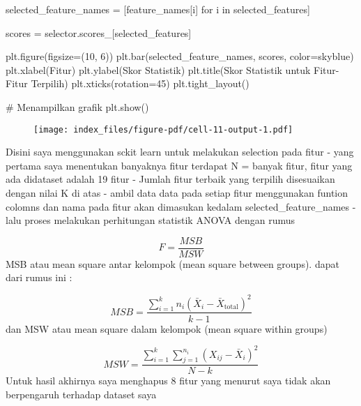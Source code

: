 \documentclass[
  letterpaper,
]{krantz}
\makeatletter
\newenvironment{Shaded}{\begin{snugshade}}{\end{snugshade}}
\newcommand{\CommentTok}[1]{\textcolor[rgb]{0.37,0.37,0.37}{#1}}
\newcommand{\ControlFlowTok}[1]{\textcolor[rgb]{0.00,0.23,0.31}{#1}}
\newcommand{\DecValTok}[1]{\textcolor[rgb]{0.68,0.00,0.00}{#1}}
\newcommand{\KeywordTok}[1]{\textcolor[rgb]{0.00,0.23,0.31}{#1}}
\newcommand{\NormalTok}[1]{\textcolor[rgb]{0.00,0.23,0.31}{#1}}
\newcommand{\OperatorTok}[1]{\textcolor[rgb]{0.37,0.37,0.37}{#1}}
\newcommand{\StringTok}[1]{\textcolor[rgb]{0.13,0.47,0.30}{#1}}
\newenvironment{kframe}{%
\medskip{}
\setlength{\fboxsep}{.8em}
 \def\at@end@of@kframe{}%
 \ifinner\ifhmode%
  \def\at@end@of@kframe{\end{minipage}}%
  \begin{minipage}{\columnwidth}%
 \fi\fi%
 \def\FrameCommand##1{\hskip\@totalleftmargin \hskip-\fboxsep
 \colorbox{shadecolor}{##1}\hskip-\fboxsep
     \hskip-\linewidth \hskip-\@totalleftmargin \hskip\columnwidth}%
 \MakeFramed {\advance\hsize-\width
   \@totalleftmargin\z@ \linewidth\hsize
   \@setminipage}}%
 {\par\unskip\endMakeFramed%
 \at@end@of@kframe}
\renewenvironment{Shaded}{\begin{kframe}}{\end{kframe}}
\makeatother
\begin{document}
\begin{Shaded}
\begin{Highlighting}[]
\NormalTok{selected\_feature\_names }\OperatorTok{=}\NormalTok{ [feature\_names[i] }\ControlFlowTok{for}\NormalTok{ i }\KeywordTok{in}\NormalTok{ selected\_features]}

\NormalTok{scores }\OperatorTok{=}\NormalTok{ selector.scores\_[selected\_features]}


\NormalTok{plt.figure(figsize}\OperatorTok{=}\NormalTok{(}\DecValTok{10}\NormalTok{, }\DecValTok{6}\NormalTok{))}
\NormalTok{plt.bar(selected\_feature\_names, scores, color}\OperatorTok{=}\StringTok{\textquotesingle{}skyblue\textquotesingle{}}\NormalTok{)}
\NormalTok{plt.xlabel(}\StringTok{\textquotesingle{}Fitur\textquotesingle{}}\NormalTok{)}
\NormalTok{plt.ylabel(}\StringTok{\textquotesingle{}Skor Statistik\textquotesingle{}}\NormalTok{)}
\NormalTok{plt.title(}\StringTok{\textquotesingle{}Skor Statistik untuk Fitur{-}Fitur Terpilih\textquotesingle{}}\NormalTok{)}
\NormalTok{plt.xticks(rotation}\OperatorTok{=}\DecValTok{45}\NormalTok{)}
\NormalTok{plt.tight\_layout()}

\CommentTok{\# Menampilkan grafik}
\NormalTok{plt.show()}
\end{Highlighting}
\end{Shaded}

\begin{figure}[H]

{\centering \texttt{[image: index\_files/figure-pdf/cell-11-output-1.pdf]}

}

\end{figure}

Disini saya menggunakan sckit learn untuk melakukan selection pada fitur
- yang pertama saya menentukan banyaknya fitur terdapat N = banyak
fitur, fitur yang ada didataset adalah 19 fitur - Jumlah fitur terbaik
yang terpilih disesuaikan dengan nilai K di atas - ambil data data pada
setiap fitur menggunakan funtion colomns dan nama pada fitur akan
dimasukan kedalam selected\_feature\_names - lalu proses melakukan
perhitungan statistik ANOVA dengan rumus

\[
F = \frac{MSB}{MSW}
\] MSB atau mean square antar kelompok (mean square between groups).
dapat dari rumus ini :

\[
MSB = \frac{\sum_{i=1}^{k} n_i (\bar{X}_i - \bar{X}_{\text{total}})^2}{k - 1}
\] dan MSW atau mean square dalam kelompok (mean square within groups)

\[
MSW = \frac{\sum_{i=1}^{k} \sum_{j=1}^{n_i} (X_{ij} - \bar{X}_i)^2}{N - k}
\] Untuk hasil akhirnya saya menghapus 8 fitur yang menurut saya tidak
akan berpengaruh terhadap dataset saya
\end{document}
